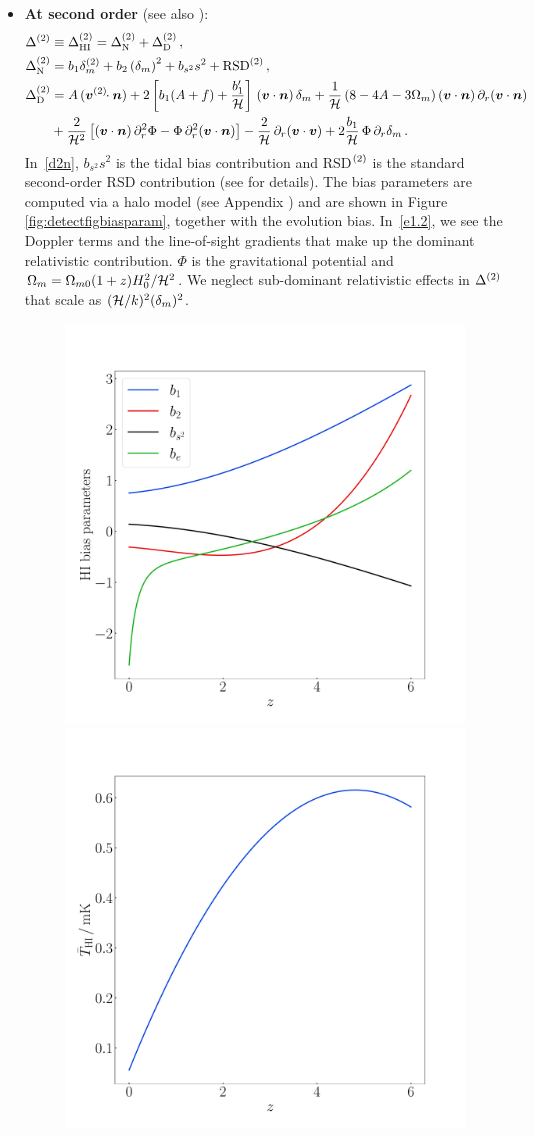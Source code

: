 \begin{itemize}
\item
{\bfseries At second order}
\cite{Maartens:2019yhx} (see also \cite{Umeh:2015gza,DiDio:2015bua,Umeh:2016thy,Clarkson:2018dwn,DiDio:2018zmk}):
\begin{align}
\Delta^{{(2)}} &\equiv \Delta^{(2)}_{{\mathrm{HI}}} = \Delta^{{(2)}}_\mathrm{N} + \Delta^{{(2)}}_\mathrm{D} \,,\\
\Delta^{{(2)}}_\mathrm{N}&= b_1\delta_m^{{(2)}}+b_2 \left(\delta_m \right)^2+ b_{s^2}s^2 + \mathrm{RSD}^{{(2)}}\,,
\label{d2n} \\
\Delta^{{(2)}}_\mathrm{D} &= A\, (\bm{v}^{(2)}\!\!\cdot\bm {n})+2\left[ b_{1} (A+f) + \frac{b_1'}{\mathcal{H}}\right]\,(\bm{v}\cdot\bm {n})\,\delta_m +\frac{1}{\mathcal{H}}\left( 8 - 4 A-3 \Omega_m \right)(\bm{v}\cdot\bm {n})\,\partial_r(\bm{v} \cdot \bm {n})
\nonumber\\ \label{e1.2}
&+\frac{2}{\mathcal{H}^2}\left[(\bm{v}\cdot\bm {n}) \,\partial_r^2\Phi-\Phi\, \partial_r^2 (\bm{v}\cdot\bm {n}) \right]
 -\frac{2}{\mathcal{H}}\,\partial_r (\bm{v}\cdot\bm{v})+2 \frac{{b_{1}}}{\mathcal{H}}\,\Phi\, \partial_r\delta_m \,.
\end{align}
In~\eqref{d2n}, $b_{s^2}s^2$ is the tidal bias contribution and RSD$^{{(2)}}$ is the standard second-order RSD contribution (see \cite{Maartens:2019yhx} for details). The bias parameters are computed via a halo model (see  Appendix ) and are shown in Figure \ref{fig:detectfigbiasparam}, together with the evolution bias.
In~\eqref{e1.2}, we see the Doppler terms and the line-of-sight gradients that make up the dominant relativistic contribution.
 $\Phi$ is the gravitational potential and $\Omega_m =\Omega_{m 0}(1+z)H_0^2/\mathcal{H}^2$. We  neglect sub-dominant relativistic effects in $\Delta^{{(2)}}$ that scale as  $(\mathcal{H}/k)^2(\delta_m)^2$. 
%
\begin{figure}[h]
\centering
\includegraphics[width=.49\textwidth]{fig/HIBias.pdf}
\includegraphics[width=.49\textwidth]{fig/THI.pdf}

\end{figure}
\end{itemize}
